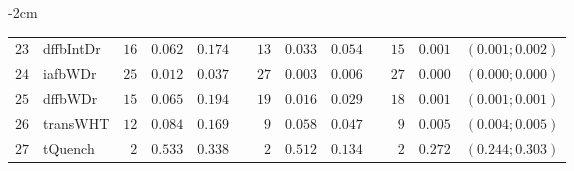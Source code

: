 \begin{table*}[!htbp]
\begin{adjustwidth*}{}{-2cm}
\begin{tabular}{@{}rlrrrrrrrrrcc@{}}
\footnotesize{$23$} & \footnotesize{dffbIntDr} & \footnotesize{$16$} & \footnotesize{$0.062$} & \footnotesize{$0.174$} && \footnotesize{$13$} & \footnotesize{$0.033$} & \footnotesize{$0.054$} && \footnotesize{$15$} & \footnotesize{$0.001$} & \footnotesize{$(0.001;0.002)$} \\
\footnotesize{$24$} & \footnotesize{iafbWDr  } & \footnotesize{$25$} & \footnotesize{$0.012$} & \footnotesize{$0.037$} && \footnotesize{$27$} & \footnotesize{$0.003$} & \footnotesize{$0.006$} && \footnotesize{$27$} & \footnotesize{$0.000$} & \footnotesize{$(0.000;0.000)$} \\
\footnotesize{$25$} & \footnotesize{dffbWDr  } & \footnotesize{$15$} & \footnotesize{$0.065$} & \footnotesize{$0.194$} && \footnotesize{$19$} & \footnotesize{$0.016$} & \footnotesize{$0.029$} && \footnotesize{$18$} & \footnotesize{$0.001$} & \footnotesize{$(0.001;0.001)$} \\
\footnotesize{$26$} & \footnotesize{transWHT } & \footnotesize{$12$} & \footnotesize{$0.084$} & \footnotesize{$0.169$} && \footnotesize{$9 $} & \footnotesize{$0.058$} & \footnotesize{$0.047$} && \footnotesize{$9 $} & \footnotesize{$0.005$} & \footnotesize{$(0.004;0.005)$} \\
\footnotesize{$27$} & \footnotesize{tQuench  } & \footnotesize{$2 $} & \footnotesize{$0.533$} & \footnotesize{$0.338$} && \footnotesize{$2 $} & \footnotesize{$0.512$} & \footnotesize{$0.134$} && \footnotesize{$2 $} & \footnotesize{$0.272$} & \footnotesize{$(0.244;0.303)$} \\
\bottomrule
\end{tabular}
\end{adjustwidth*}
\end{table*}

